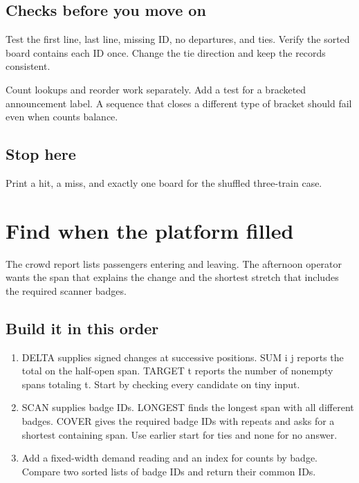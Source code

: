 \documentclass[11pt,letterpaper]{article}
\begin{document}
\subsection*{Checks before you move on}

Test the first line, last line, missing ID, no departures, and ties. Verify the sorted board contains each ID once. Change the tie direction and keep the records consistent.

Count lookups and reorder work separately. Add a test for a bracketed announcement label. A sequence that closes a different type of bracket should fail even when counts balance.

\subsection*{Stop here}

Print a hit, a miss, and exactly one board for the shuffled three-train case.

\clearpage

\section{Find when the platform filled}\label{trains:02}

The crowd report lists passengers entering and leaving. The afternoon operator wants the span that explains the change and the shortest stretch that includes the required scanner badges.

\subsection*{Build it in this order}

\begin{enumerate}
\item DELTA supplies signed changes at successive positions. SUM i j reports the total on the half-open span. TARGET t reports the number of nonempty spans totaling t. Start by checking every candidate on tiny input.
\item SCAN supplies badge IDs. LONGEST finds the longest span with all different badges. COVER gives the required badge IDs with repeats and asks for a shortest containing span. Use earlier start for ties and none for no answer.
\item Add a fixed-width demand reading and an index for counts by badge. Compare two sorted lists of badge IDs and return their common IDs.
\end{enumerate}
\end{document}
